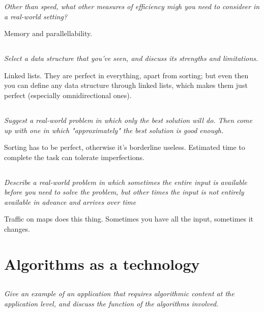 \documentclass[11pt,oneside,titlepage]{book}
\begin{document}
\textit{Other than speed, what other measures of efficiency migh you need to consideer
  in a real-world setting?}

Memory and parallellability.

\subsection{}

\textit{Select a data structure that you've seen, and discuss its strengths and limitations.}

Linked lists. They are perfect in everything, apart from sorting; but even then you can define
any data structure through linked lists, which makes them just perfect (especially
omnidirectional ones).

\subsection{}

\textit{Suggest a real-world problem in which only the best solution will do. Then come up
  with one in which "approximately" the best solution is good enough.}

Sorting has to be perfect, otherwise it's borderline useless. Estimated time to
complete the task can tolerate imperfections.

\subsection{}

\textit{Describe a real-world problem in which sometimes the entire input is available
  before you need to solve the problem, but other times the input is not
  entirely available in advance and arrives over time}

Traffic on maps does this thing. Sometimes you have all the input, sometimes it changes.


\section{Algorithms as a technology}

\subsection{}

\textit{Give an example of an application that requires algorithmic content at the
  application level, and discuss the function of the algorithms involved.}
\end{document}
